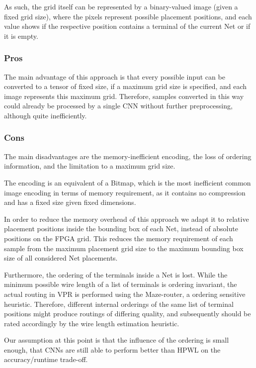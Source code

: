 As such, the grid itself can be represented by a binary-valued image (given a fixed grid size), where the pixels represent possible placement positions, and each value shows if the respective position contains a terminal of the current Net or if it is empty.

\subsubsection{Pros}

The main advantage of this approach is that every possible input can be converted to a tensor of fixed size, if a maximum grid size is specified, and each image represents this maximum grid. Therefore, samples converted in this way could already be processed by a single \gls{CNN} without further preprocessing, although quite inefficiently.

\subsubsection{Cons}

The main disadvantages are the memory-inefficient encoding, the loss of ordering information, and the limitation to a maximum grid size.

The encoding is an equivalent of a Bitmap, which is the most inefficient common image encoding in terms of memory requirement, as it contains no compression and has a fixed size given fixed dimensions.

In order to reduce the memory overhead of this approach we adapt it to relative placement positions inside the bounding box of each Net, instead of absolute positions on the \gls{FPGA} grid. This reduces the memory requirement of each sample from the maximum placement grid size to the maximum bounding box size of all considered Net placements.

Furthermore, the ordering of the terminals inside a Net is lost. While the minimum possible wire length of a list of terminals is ordering invariant, the actual routing in \gls{VPR} is performed using the Maze-router, a ordering sensitive heuristic. Therefore, different internal orderings of the same list of terminal positions might produce routings of differing quality, and subsequently should be rated accordingly by the wire length estimation heuristic.

Our assumption at this point is that the influence of the ordering is small enough, that \glspl{CNN} are still able to perform better than \gls{HPWL} on the accuracy/runtime trade-off.

